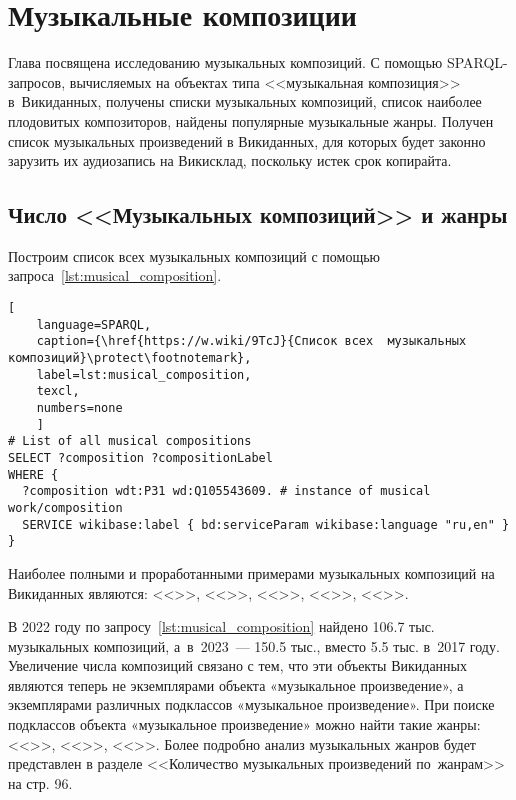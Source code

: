 \chapter{Музыкальные композиции}
\label{ch:musical-composition}
Глава посвящена исследованию музыкальных композиций. 
С помощью SPARQL-запросов, вычисляемых на объектах типа <<музыкальная композиция>> в~Викиданных, 
получены списки музыкальных композиций, список наиболее плодовитых композиторов, 
найдены популярные музыкальные жанры. 
Получен список музыкальных произведений в Викиданных, 
для которых будет законно зарузить их аудиозапись на Викисклад, поскольку истек срок копирайта.

\section{Число <<Музыкальных композиций>> и жанры}


Построим список всех музыкальных композиций с помощью запроса~\ref{lst:musical_composition}.

\begin{lstlisting}[ 
    language=SPARQL,
    caption={\href{https://w.wiki/9TcJ}{Список всех  музыкальных композиций}\protect\footnotemark},
    label=lst:musical_composition,
    texcl,
    numbers=none
    ]
# List of all musical compositions
SELECT ?composition ?compositionLabel
WHERE {
  ?composition wdt:P31 wd:Q105543609. # instance of musical work/composition
  SERVICE wikibase:label { bd:serviceParam wikibase:language "ru,en" }
}
\end{lstlisting}%

Наиболее полными и проработанными примерами музыкальных композиций на Викиданных являются: <<>>, <<>>, <<>>, <<>>, <<>>.

В 2022 году по запросу~\ref{lst:musical_composition} найдено \num{106,7} тыс. музыкальных композиций, 
а~в~2023~--- \num{150,5} тыс., вместо \num{5,5} тыс. в~2017 году. 
Увеличение числа композиций связано с тем, что эти объекты Викиданных являются теперь не экземплярами объекта «музыкальное произведение», а экземплярами различных подклассов «музыкальное произведение». При поиске подклассов объекта «музыкальное произведение» можно найти такие жанры: <<>>, <<>>, <<>>. Более подробно анализ музыкальных жанров будет представлен в разделе <<Количество музыкальных произведений по~жанрам>> на стр. 96.


